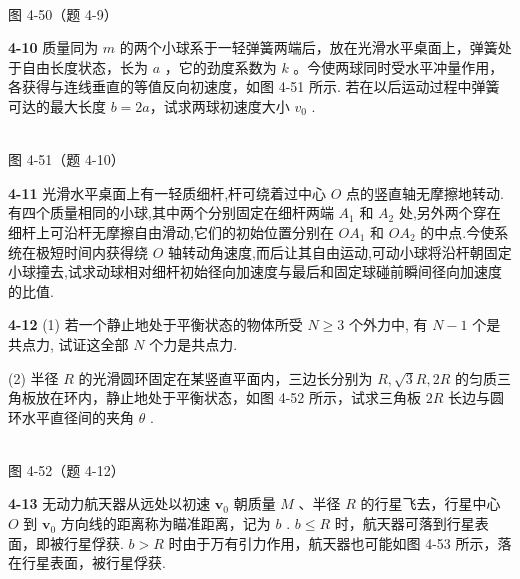 \begin{center}
\resizebox{0.50\textwidth}{!}{}\\[4pt]
{\small 图 4-50（题 4-9）}
\end{center}

\newpage

\textbf{4-10} 质量同为 $m$ 的两个小球系于一轻弹簧两端后，放在光滑水平桌面上，弹簧处于自由长度状态，长为 $a$ ，它的劲度系数为 $k$ 。今使两球同时受水平冲量作用，各获得与连线垂直的等值反向初速度，如图 4-51 所示. 若在以后运动过程中弹簧可达的最大长度 $b=2a$，试求两球初速度大小 $v_{0}$ .

\begin{center}
\resizebox{0.39\textwidth}{!}{}\\[4pt]
{\small 图 4-51（题 4-10）}
\end{center}

\newpage

\textbf{4-11} 光滑水平桌面上有一轻质细杆,杆可绕着过中心 $O$ 点的竖直轴无摩擦地转动.有四个质量相同的小球,其中两个分别固定在细杆两端 $A_{1}$ 和 $A_{2}$ 处,另外两个穿在细杆上可沿杆无摩擦自由滑动,它们的初始位置分别在 $OA_{1}$ 和 $OA_{2}$ 的中点.今使系统在极短时间内获得绕 $O$ 轴转动角速度,而后让其自由运动,可动小球将沿杆朝固定小球撞去,试求动球相对细杆初始径向加速度与最后和固定球碰前瞬间径向加速度的比值.

\newpage

\textbf{4-12} (1) 若一个静止地处于平衡状态的物体所受 $N \geqslant 3$ 个外力中, 有 $N - 1$ 个是共点力, 试证这全部 $N$ 个力是共点力.

(2) 半径 $R$ 的光滑圆环固定在某竖直平面内，三边长分别为 $R, \sqrt{3}R, 2R$ 的匀质三角板放在环内，静止地处于平衡状态，如图 4-52 所示，试求三角板 $2R$ 长边与圆环水平直径间的夹角 $\theta$ .

\begin{center}
\resizebox{0.40\textwidth}{!}{}\\[4pt]
{\small 图 4-52（题 4-12）}
\end{center}

\newpage

\textbf{4-13} 无动力航天器从远处以初速 $\pmb{v}_0$ 朝质量 $M$ 、半径 $R$ 的行星飞去，行星中心 $O$ 到 $\pmb{v}_0$ 方向线的距离称为瞄准距离，记为 $b$ . $b \leqslant R$ 时，航天器可落到行星表面，即被行星俘获. $b > R$ 时由于万有引力作用，航天器也可能如图 4-53 所示，落在行星表面，被行星俘获.

